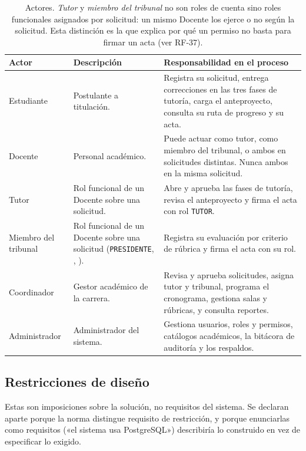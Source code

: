 \documentclass[11pt,a4paper]{article}
\DeclareRobustCommand{\cd}[1]{\texttt{\protect\seqsplit{#1}}}
\begin{document}
\begin{table}[H]\centering\small
\begin{tabular}{p{2.6cm} p{4.2cm} p{7.6cm}}
\toprule
\textbf{Actor} & \textbf{Descripción} & \textbf{Responsabilidad en el proceso} \\
\midrule
Estudiante & Postulante a titulación. & Registra su solicitud, entrega correcciones en las
tres fases de tutoría, carga el anteproyecto, consulta su ruta de progreso y su acta. \\
Docente & Personal académico. & Puede actuar como tutor, como miembro del tribunal, o ambos en
solicitudes distintas. Nunca ambos en la misma solicitud. \\
Tutor & Rol funcional de un Docente sobre una solicitud. & Abre y aprueba las fases de tutoría,
revisa el anteproyecto y firma el acta con rol \texttt{TUTOR}. \\
Miembro del tribunal & Rol funcional de un Docente sobre una solicitud
(\texttt{PRESIDENTE}, \cd{VOCAL\_1}, \cd{VOCAL\_2}). & Registra su evaluación por
criterio de rúbrica y firma el acta con su rol. \\
Coordinador & Gestor académico de la carrera. & Revisa y aprueba solicitudes, asigna tutor y
tribunal, programa el cronograma, gestiona salas y rúbricas, y consulta reportes. \\
Administrador & Administrador del sistema. & Gestiona usuarios, roles y permisos, catálogos
académicos, la bitácora de auditoría y los respaldos. \\
\bottomrule
\end{tabular}
\caption{Actores. \emph{Tutor} y \emph{miembro del tribunal} no son roles de cuenta sino roles
funcionales asignados por solicitud: un mismo Docente los ejerce o no según la solicitud. Esta
distinción es la que explica por qué un permiso no basta para firmar un acta (ver RF-37).}
\end{table}

\subsection{Restricciones de diseño}
\label{sec:restricciones}

Estas son imposiciones sobre la solución, no requisitos del sistema. Se declaran aparte porque
la norma distingue requisito de restricción, y porque enunciarlas como requisitos («el sistema
usa PostgreSQL») describiría lo construido en vez de especificar lo exigido.
\end{document}
